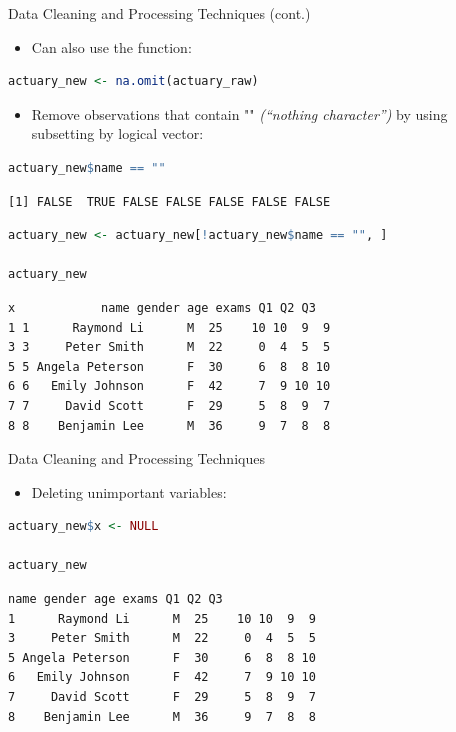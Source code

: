 \begin{frame}[fragile]{Data Cleaning and Processing Techniques (cont.)}
\begin{itemize}
  \item Can also use the  function:
\end{itemize}
\begin{lstlisting}[language=R]
actuary_new <- na.omit(actuary_raw)
\end{lstlisting}
\begin{itemize}
  \item Remove observations that contain "" \textit{(“nothing character”)} by using subsetting by logical vector:
\end{itemize}
\begin{lstlisting}[language=R]
actuary_new$name == ""
\end{lstlisting}
\begin{lstlisting}[style=output]
[1] FALSE  TRUE FALSE FALSE FALSE FALSE FALSE
\end{lstlisting}
\begin{lstlisting}[language=R]
actuary_new <- actuary_new[!actuary_new$name == "", ]

actuary_new
\end{lstlisting}
\begin{lstlisting}[style=output]
  x            name gender age exams Q1 Q2 Q3
1 1      Raymond Li      M  25    10 10  9  9
3 3     Peter Smith      M  22     0  4  5  5
5 5 Angela Peterson      F  30     6  8  8 10
6 6   Emily Johnson      F  42     7  9 10 10
7 7     David Scott      F  29     5  8  9  7
8 8    Benjamin Lee      M  36     9  7  8  8
\end{lstlisting}
\end{frame}

\begin{frame}[fragile]{Data Cleaning and Processing Techniques}
\begin{itemize}
  \item Deleting unimportant variables:
\end{itemize}
\begin{lstlisting}[language=R]
actuary_new$x <- NULL

actuary_new
\end{lstlisting}
\begin{lstlisting}[style=output]
             name gender age exams Q1 Q2 Q3
1      Raymond Li      M  25    10 10  9  9
3     Peter Smith      M  22     0  4  5  5
5 Angela Peterson      F  30     6  8  8 10
6   Emily Johnson      F  42     7  9 10 10
7     David Scott      F  29     5  8  9  7
8    Benjamin Lee      M  36     9  7  8  8
\end{lstlisting}
\end{frame}

